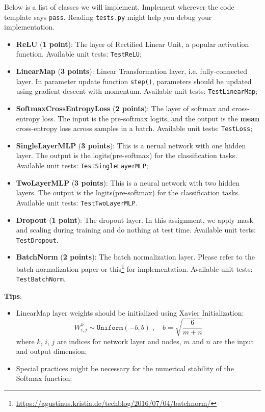 Below is a list of classes we will implement. Implement wherever the code template says \texttt{pass}. Reading \texttt{tests.py} might help you debug your implementation. 

\begin{itemize}
    \item {\bf ReLU} ({\bf 1 point}): The layer of Rectified Linear Unit, a popular activation function. Available unit tests: \texttt{TestReLU};
    
    \item {\bf LinearMap} ({\bf 3 points}): Linear Transformation layer, i.e. fully-connected layer. In parameter update function \texttt{step()}, parameters should be updated using gradient descent with momentum. Available unit tests: \texttt{TestLinearMap};
    
    \item {\bf SoftmaxCrossEntropyLoss} ({\bf 2 points}): The layer of softmax and cross-entropy loss. The input is the pre-softmax logits, and the output is the \textbf{mean} cross-entropy loss across samples in a batch. Available unit tests: \texttt{TestLoss};
    
    \item {\bf SingleLayerMLP} ({\bf 3 points}): This is a nerual network with one hidden layer. The output is the logits(pre-softmax) for the classification tasks. Available unit tests: \texttt{TestSingleLayerMLP};
    
    \item {\bf TwoLayerMLP} ({\bf 3 points}): This is a neural network with two hidden layers. The output is the logits(pre-softmax) for the classification tasks. Available unit tests: \texttt{TestTwoLayerMLP}.
    
    \item {\bf Dropout} ({\bf 1 point}): The dropout layer. In this assignment, we apply mask and scaling during training and do nothing at test time. Available unit tests: \texttt{TestDropout}.
    
    \item {\bf BatchNorm} ({\bf 2 points}): The batch normalization layer. Please refer to the batch normalization paper or this\footnote{\url{https://agustinus.kristia.de/techblog/2016/07/04/batchnorm/}} for implementation. Available unit tests: \texttt{TestBatchNorm}.
\end{itemize}
\pagebreak
\textbf{Tips}:
\begin{itemize}
    \item LinearMap layer weights should be initialized using Xavier Initialization:
        \[W^k_{i,j}\sim\texttt{Uniform}(-b,b) \;,\quad b=\sqrt{\frac{6}{m+n}}\]
     where $k$, $i$, $j$ are indices for network layer and nodes, $m$ and $n$ are the input and output dimension;
    \item Special practices might be necessary for the numerical stability of the Softmax function;
\end{itemize}

